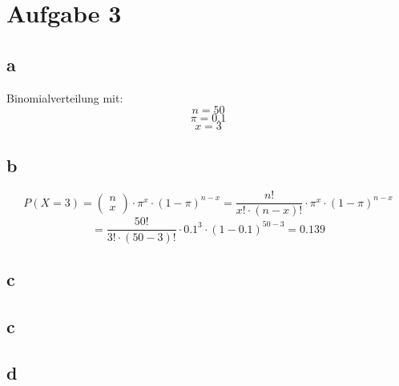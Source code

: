 
\section{Aufgabe 3}
\subsection{a}
Binomialverteilung mit: 
\[ n = 50 \]
\[ \pi = 0.1 \]
\[ x = 3 \]

\subsection{b}
\[ P(X=3) = \left( \begin{array}{l}n\\x\end{array} \right) 
\cdot \pi^x \cdot (1 - \pi)^{n-x} 
= \frac{n!}{x! \cdot (n-x)!} \cdot \pi^x \cdot (1 - \pi)^{n-x} \]
\[ = \frac{50!}{3! \cdot (50-3)!} \cdot 0.1^3 \cdot (1 - 0.1)^{50-3} 
= 0.139 \]

\subsection{c}


\subsection{c}


\subsection{d}

